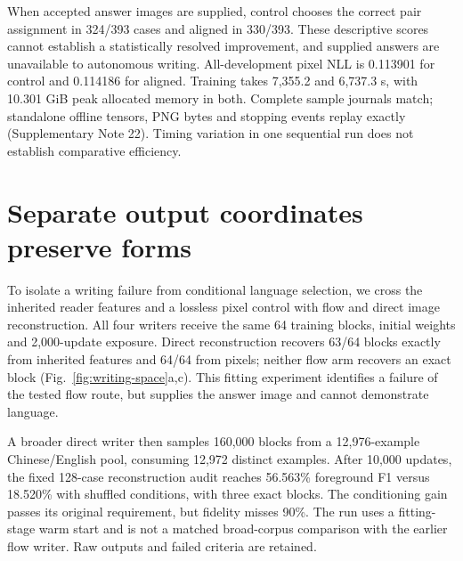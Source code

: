 When accepted answer images are supplied, control chooses the correct pair
assignment in 324/393 cases and aligned in 330/393. These descriptive scores
cannot establish a statistically resolved improvement, and supplied answers
are unavailable to autonomous writing. All-development pixel NLL is 0.113901
for control and 0.114186 for aligned. Training takes 7,355.2 and 6,737.3 s,
with 10.301 GiB peak allocated memory in both. Complete sample journals match;
standalone offline tensors, PNG bytes and stopping events replay exactly
(Supplementary Note 22). Timing variation in one sequential run does not
establish comparative efficiency.


\section*{Separate output coordinates preserve forms}
To isolate a writing failure from conditional language selection, we cross
the inherited reader features and a lossless pixel control with flow and
direct image reconstruction. All four writers receive the same 64 training
blocks, initial weights and 2,000-update exposure. Direct reconstruction
recovers 63/64 blocks exactly from inherited features and 64/64 from pixels;
neither flow arm recovers an exact block (Fig.~\ref{fig:writing-space}a,c).
This fitting experiment identifies a failure of the tested flow route, but
supplies the answer image and cannot demonstrate language.

A broader direct writer then samples 160,000 blocks from a 12,976-example
Chinese/English pool, consuming 12,972 distinct examples. After 10,000 updates,
the fixed 128-case reconstruction audit reaches 56.563\% foreground F1 versus
18.520\% with shuffled conditions, with three exact blocks. The conditioning
gain passes its original requirement, but fidelity misses 90\%. The run
uses a fitting-stage warm start and is not a matched broad-corpus comparison
with the earlier flow writer. Raw outputs and failed criteria are retained.

